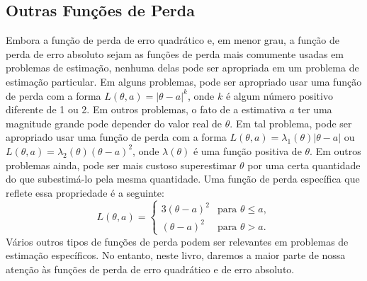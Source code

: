 \subsection*{Outras Funções de Perda}
Embora a função de perda de erro quadrático e, em menor grau, a função de perda de erro absoluto sejam as funções de perda mais comumente usadas em problemas de estimação, nenhuma delas pode ser apropriada em um problema de estimação particular. Em alguns problemas, pode ser apropriado usar uma função de perda com a forma $L(\theta, a)=|\theta-a|^k$, onde $k$ é algum número positivo diferente de 1 ou 2. Em outros problemas, o fato de a estimativa $a$ ter uma magnitude grande pode depender do valor real de $\theta$. Em tal problema, pode ser apropriado usar uma função de perda com a forma $L(\theta, a) = \lambda_1(\theta)|\theta-a|$ ou $L(\theta, a)=\lambda_2(\theta)(\theta-a)^2$, onde $\lambda(\theta)$ é uma função positiva de $\theta$. Em outros problemas ainda, pode ser mais custoso superestimar $\theta$ por uma certa quantidade do que subestimá-lo pela mesma quantidade. Uma função de perda específica que reflete essa propriedade é a seguinte:
$$ L(\theta, a) =
\begin{cases}
3(\theta-a)^2 & \text{para } \theta \le a, \\
(\theta-a)^2 & \text{para } \theta > a.
\end{cases}
$$
Vários outros tipos de funções de perda podem ser relevantes em problemas de estimação específicos. No entanto, neste livro, daremos a maior parte de nossa atenção às funções de perda de erro quadrático e de erro absoluto.

